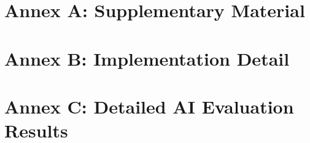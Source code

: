 \documentclass[10pt,a4paper]{report}
\begin{document}
\pagestyle{empty}

\setcounter{page}{1}
\pagestyle{fancy}
\appendix

\chapter{Annex A: Supplementary Material}

\chapter{Annex B: Implementation Detail}

\chapter{Annex C: Detailed AI Evaluation Results}

\end{document}

